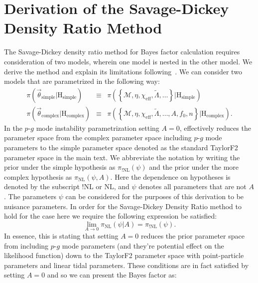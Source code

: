 \section{Derivation of the Savage-Dickey Density Ratio Method}\label{sec:sddr_derivation}
The Savage-Dickey density ratio method for Bayes factor calculation requires consideration of two models, wherein one model is nested in the other model. We derive the method and explain its limitations following~\cite{wagenmakers2010bayesian}. We can consider two models that are parametrized in the following way:
\begin{eqnarray}
    \pi \left(\vec{\theta}_{\mathrm{simple}}|\mathrm{H}_{\mathrm{simple}}\right)  &\equiv& \pi \left(\left \{\mathcal{M}, \eta, \chi_{\mathrm{eff}}, \tilde{\Lambda}, \ldots  \right \} | \mathrm{H}_{\mathrm{simple}} \right)\\
    \pi \left(\vec{\theta}_{\mathrm{complex}}| \mathrm{H}_{\mathrm{complex}}\right) &\equiv& \pi \left(\left \{\mathcal{M}, \eta, \chi_{\mathrm{eff}}, \tilde{\Lambda}, \ldots , A, f_0, n \right \}| \mathrm{H}_{\mathrm{complex}}\right).
\end{eqnarray}
In the $p$-$g$ mode instability parametrization setting $A = 0$, effectively reduces the parameter space from the complex parameter space including $p$-$g$ mode parameters to the simple parameter space denoted as the standard TaylorF2 parameter space in the main text. We abbreviate the notation by writing the prior under the simple hypothesis  as $\pi_{!\mathrm{NL}} \left(\psi \right)$ and the prior under the more complex hypothesis as $\pi_{\mathrm{NL}} \left(\psi, A\right)$. Here the dependence on hypotheses is denoted by the subscript !NL or NL, and $\psi$ denotes all parameters that are not $A$. The parameters $\psi$ can be considered for the purposes of this derivation to be nuisance parameters. In order for the Savage-Dickey Density Ratio method to hold for the case here we require the following expression be satisfied:
\begin{equation}\label{eqn:sddr_condition}
    \lim_{A \to 0} \pi_{\mathrm{NL}} \left(\psi | A\right) = \pi_{\mathrm{!NL}}\left(\psi\right).
\end{equation}
In essence, this is stating that setting $A = 0$ reduces the prior parameter space from including $p$-$g$ mode parameters (and they're potential effect on the likelihood function) down to the TaylorF2 parameter space with point-particle parameters and linear tidal parameters. These conditions are in fact satisfied by setting $A=0$ and so we can present the Bayes factor as:
